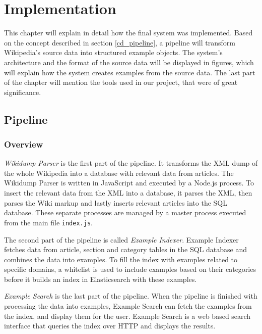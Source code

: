 
\chapter{Implementation}\label{cap_4}


This chapter will explain in detail how the final system was implemented. Based on the concept described in section \ref{cd_pipeline}, a pipeline will transform Wikipedia's source data into structured example objects. The system's architecture and the format of the source data will be displayed in figures, which will explain how the system creates examples from the source data. The last part of the chapter will mention the tools used in our project, that were of great significance.

\section{Pipeline}

\subsection{Overview}


\textit{Wikidump Parser} is the first part of the pipeline. It transforms the XML dump of the whole Wikipedia into a database with relevant data from articles. The Wikidump Parser is written in JavaScript and executed by a Node.js process. To insert the relevant data from the XML into a database, it parses the XML, then parses the Wiki markup and lastly inserts relevant articles into the SQL database. These separate processes are managed by a master process executed from the main file \texttt{index.js}.


The second part of the pipeline is called \textit{Example Indexer}. Example Indexer fetches data from article, section and category tables in the SQL database and combines the data into examples. To fill the index with examples related to specific domains, a whitelist is used to include examples based on their categories before it builds an index in Elasticsearch with these examples.

\textit{Example Search} is the last part of the pipeline. When the pipeline is finished with processing the data into examples, Example Search can fetch the examples from the index, and display them for the user. Example Search is a web based search interface that queries the index over HTTP and displays the results.

